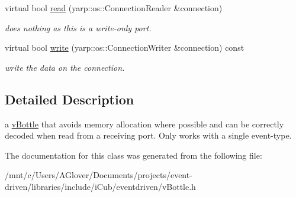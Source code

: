 \begin{DoxyCompactItemize}
\mbox{\label{classev_1_1vBottleMimic_a5c7ead7b0484b9abe99e922196c074ff}} 
virtual bool \hyperlink{classev_1_1vBottleMimic_a5c7ead7b0484b9abe99e922196c074ff}{read} (yarp\+::os\+::\+Connection\+Reader \&connection)
\begin{DoxyCompactList}\small\item\em does nothing as this is a write-\/only port. \end{DoxyCompactList}\item 
\mbox{\label{classev_1_1vBottleMimic_a70d7add0350d3254f6867a3dd7f6c50b}} 
virtual bool \hyperlink{classev_1_1vBottleMimic_a70d7add0350d3254f6867a3dd7f6c50b}{write} (yarp\+::os\+::\+Connection\+Writer \&connection) const
\begin{DoxyCompactList}\small\item\em write the data on the connection. \end{DoxyCompactList}\end{DoxyCompactItemize}


\subsection{Detailed Description}
a \hyperlink{classev_1_1vBottle}{v\+Bottle} that avoids memory allocation where possible and can be correctly decoded when read from a receiving port. Only works with a single event-\/type. 

The documentation for this class was generated from the following file\+:\begin{DoxyCompactItemize}
\item 
/mnt/c/\+Users/\+A\+Glover/\+Documents/projects/event-\/driven/libraries/include/i\+Cub/eventdriven/v\+Bottle.\+h\end{DoxyCompactItemize}
